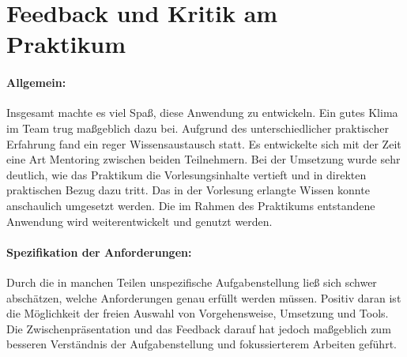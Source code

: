 
\section{Feedback und Kritik am Praktikum}

\paragraph{Allgemein:} Insgesamt machte es viel Spaß, diese Anwendung zu entwickeln. Ein gutes Klima im Team trug maßgeblich dazu bei. 
Aufgrund des unterschiedlicher praktischer Erfahrung fand ein reger Wissensaustausch statt. Es entwickelte sich mit der Zeit eine Art Mentoring zwischen beiden Teilnehmern.
Bei der Umsetzung wurde sehr deutlich, wie das Praktikum die Vorlesungsinhalte vertieft und in direkten praktischen Bezug dazu tritt. Das in der Vorlesung erlangte Wissen konnte anschaulich umgesetzt werden. Die im Rahmen des Praktikums entstandene Anwendung wird weiterentwickelt und genutzt werden.


\paragraph{Spezifikation der Anforderungen:} Durch die in manchen Teilen unspezifische Aufgabenstellung ließ sich schwer abschätzen, welche Anforderungen genau erfüllt werden müssen.
Positiv daran ist die Möglichkeit der freien Auswahl von Vorgehensweise, Umsetzung und Tools.
Die Zwischenpräsentation und das Feedback darauf hat jedoch maßgeblich zum besseren Verständnis der Aufgabenstellung und fokussierterem Arbeiten geführt.